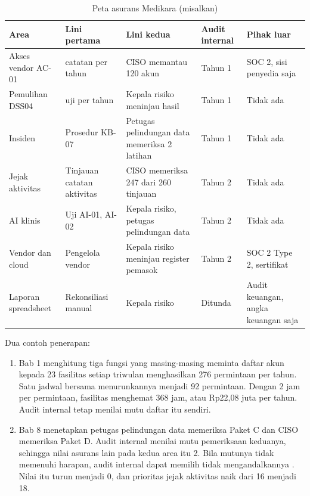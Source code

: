 \begin{table}[!htb]
  \centering\small
  \caption{Peta asurans Medikara (misalkan)}\label{tab:ch12-peta-asurans}
  \begin{tabularx}{\textwidth}{|>{\raggedright\arraybackslash}p{}|>{\raggedright\arraybackslash}X|>{\raggedright\arraybackslash}X|>{\raggedright\arraybackslash}p{}|>{\raggedright\arraybackslash}p{}|}
    \hline
    \textbf{Area} & \textbf{Lini pertama} & \textbf{Lini kedua} & \textbf{Audit internal} &
    \textbf{Pihak luar} \\ \hline
    Akses vendor AC-01 & 60 catatan per tahun & CISO memantau 120 akun & Tahun 1 & SOC 2, sisi
    penyedia saja \\ \hline
    Pemulihan DSS04 & 144 uji per tahun & Kepala risiko meninjau hasil & Tahun 1 & Tidak ada \\
    \hline
    Insiden & Prosedur KB-07 & Petugas pelindungan data memeriksa 2 latihan & Tahun 1 & Tidak ada
    \\ \hline
    Jejak aktivitas & Tinjauan catatan aktivitas & CISO memeriksa 247 dari 260 tinjauan & Tahun 2 &
    Tidak ada \\ \hline
    AI klinis & Uji AI-01, AI-02 & Kepala risiko, petugas pelindungan data & Tahun 2 & Tidak ada \\
    \hline
    Vendor dan cloud & Pengelola vendor & Kepala risiko meninjau register pemasok & Tahun 2 & SOC 2
    Type 2, sertifikat \\ \hline
    Laporan spreadsheet & Rekonsiliasi manual & Kepala risiko & Ditunda & Audit keuangan, angka
    keuangan saja \\ \hline
  \end{tabularx}
\end{table}

Dua contoh penerapan:
\begin{enumerate}
  \item Bab 1 menghitung tiga fungsi yang masing-masing meminta daftar akun kepada 23 fasilitas
  setiap triwulan menghasilkan 276 permintaan per tahun. Satu jadwal bersama menurunkannya menjadi
  92 permintaan. Dengan 2 jam per permintaan, fasilitas menghemat 368 jam, atau Rp22,08 juta per
  tahun. Audit internal tetap menilai mutu daftar itu sendiri.
  \item Bab 8 menetapkan petugas pelindungan data memeriksa Paket C dan CISO memeriksa Paket D.
  Audit internal menilai mutu pemeriksaan keduanya, sehingga nilai asurans lain pada kedua area
  itu 2. Bila mutunya tidak memenuhi harapan, audit internal dapat memilih tidak mengandalkannya
  \cite{iia-tlm2026}. Nilai itu turun menjadi 0, dan prioritas jejak aktivitas naik dari 16 menjadi
  18.
\end{enumerate}


